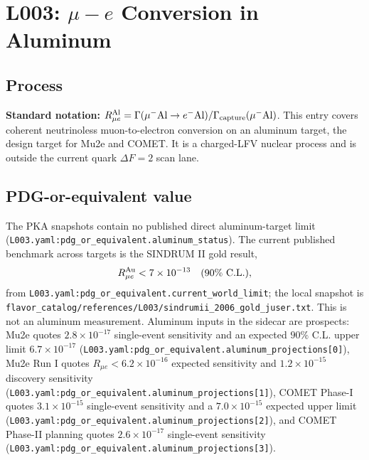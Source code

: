 
\section{L003: \texorpdfstring{\(\mu-e\)}{mu-e} Conversion in Aluminum}

\subsection*{Process}
\textbf{Standard notation:} \(R_{\mu e}^{\rm Al} =
\Gamma(\mu^-{\rm Al}\to e^-{\rm Al})/\Gamma_{\rm capture}(\mu^-{\rm Al})\).
This entry covers coherent neutrinoless muon-to-electron conversion on an
aluminum target, the design target for Mu2e and COMET.  It is a charged-LFV
nuclear process and is outside the current quark \(\Delta F=2\) scan lane.

\subsection*{PDG-or-equivalent value}
The PKA snapshots contain no published direct aluminum-target limit
(\texttt{L003.yaml:pdg\_or\_equivalent.aluminum\_status}).  The current
published benchmark across targets is the SINDRUM II gold result,
\[
  R_{\mu e}^{\rm Au} < 7\times10^{-13}\quad (90\%\ {\rm C.L.}),
\]
from \texttt{L003.yaml:pdg\_or\_equivalent.current\_world\_limit}; the local
snapshot is
\texttt{flavor\_catalog/references/L003/sindrumii\_2006\_gold\_juser.txt}.
This is not an aluminum measurement.  Aluminum inputs in the sidecar are
prospects: Mu2e quotes \(2.8\times10^{-17}\) single-event sensitivity and an
expected \(90\%\) C.L. upper limit \(6.7\times10^{-17}\)
(\texttt{L003.yaml:pdg\_or\_equivalent.aluminum\_projections[0]}), Mu2e Run I
quotes \(R_{\mu e}<6.2\times10^{-16}\) expected sensitivity and
\(1.2\times10^{-15}\) discovery sensitivity
(\texttt{L003.yaml:pdg\_or\_equivalent.aluminum\_projections[1]}), COMET
Phase-I quotes \(3.1\times10^{-15}\) single-event sensitivity and a
\(7.0\times10^{-15}\) expected upper limit
(\texttt{L003.yaml:pdg\_or\_equivalent.aluminum\_projections[2]}), and COMET
Phase-II planning quotes \(2.6\times10^{-17}\) single-event sensitivity
(\texttt{L003.yaml:pdg\_or\_equivalent.aluminum\_projections[3]}).

